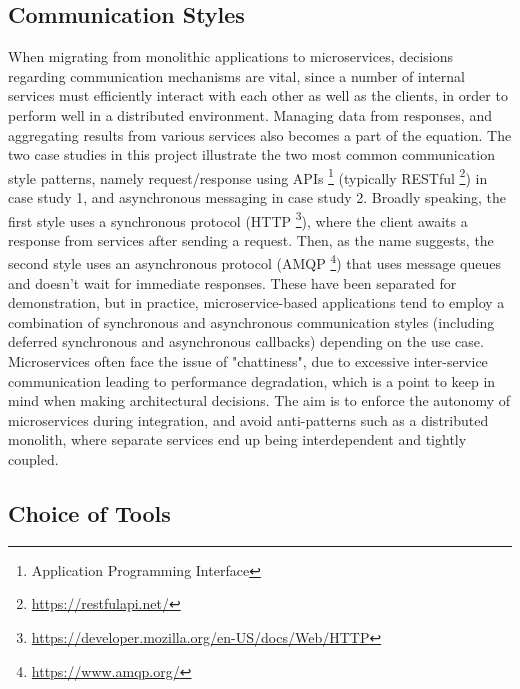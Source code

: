 \subsection{Communication Styles}

When migrating from monolithic applications to microservices, decisions regarding communication mechanisms are vital, since a number of internal services must efficiently interact with each other as well as the clients, in order to perform well in a distributed environment. Managing data from responses, and aggregating results from various services also becomes a part of the equation. The two case studies in this project illustrate the two most common communication style patterns, namely request/response using APIs \footnote{Application Programming Interface} (typically RESTful \footnote{\url{https://restfulapi.net/}}) in case study 1, and asynchronous messaging in case study 2. Broadly speaking, the first style uses a synchronous protocol (HTTP \footnote{\url{https://developer.mozilla.org/en-US/docs/Web/HTTP}}), where the client awaits a response from services after sending a request. Then, as the name suggests, the second style uses an asynchronous protocol (AMQP \footnote{\url{https://www.amqp.org/}}) that uses message queues and doesn't wait for immediate responses. These have been separated for demonstration, but in practice, microservice-based applications tend to employ a combination of synchronous and asynchronous communication styles (including deferred synchronous and asynchronous callbacks) depending on the use case. Microservices often face the issue of "chattiness", due to excessive inter-service communication leading to performance degradation, which is a point to keep in mind when making architectural decisions. The aim is to enforce the autonomy of microservices during integration, and avoid anti-patterns such as a distributed monolith, where separate services end up being interdependent and tightly coupled.

\subsection{Choice of Tools}

